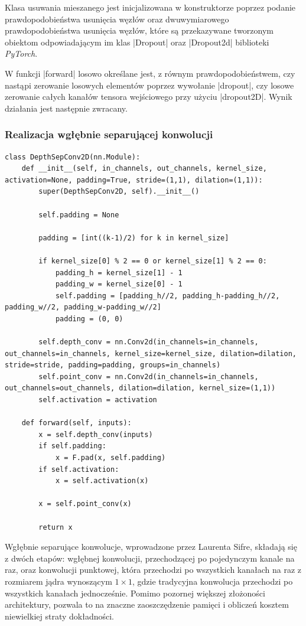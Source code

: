 Klasa usuwania mieszanego jest inicjalizowana w konstruktorze poprzez podanie prawdopodobieństwa usunięcia węzłów oraz dwuwymiarowego prawdopodobieństwa usunięcia węzłów, które są przekazywane tworzonym obiektom odpowiadającym im klas \pyth|Dropout| oraz \pyth|Dropout2d| biblioteki \textit{PyTorch}.

W funkcji \pyth|forward| losowo określane jest, z równym prawdopodobieństwem, czy nastąpi zerowanie losowych elementów poprzez wywołanie \pyth|dropout|, czy losowe zerowanie całych kanałów tensora wejściowego przy użyciu \pyth|dropout2D|. Wynik działania jest następnie zwracany. 


\subsubsection{Realizacja wgłębnie separującej konwolucji}

\begin{lstlisting}[caption={\pyth|DepSepConv2D| - klasa wgłębnie separującej konwolucji dwuwymiarowej.}, label={DepSepConv}]
class DepthSepConv2D(nn.Module):
	def __init__(self, in_channels, out_channels, kernel_size, activation=None, padding=True, stride=(1,1), dilation=(1,1)):
		super(DepthSepConv2D, self).__init__()
	
		self.padding = None
		
		padding = [int((k-1)/2) for k in kernel_size]
		
		if kernel_size[0] % 2 == 0 or kernel_size[1] % 2 == 0:
			padding_h = kernel_size[1] - 1
			padding_w = kernel_size[0] - 1
			self.padding = [padding_h//2, padding_h-padding_h//2, padding_w//2, padding_w-padding_w//2]
			padding = (0, 0)
		
		self.depth_conv = nn.Conv2d(in_channels=in_channels, out_channels=in_channels, kernel_size=kernel_size, dilation=dilation, stride=stride, padding=padding, groups=in_channels)
		self.point_conv = nn.Conv2d(in_channels=in_channels, out_channels=out_channels, dilation=dilation, kernel_size=(1,1))
		self.activation = activation
	
	def forward(self, inputs):
		x = self.depth_conv(inputs)
		if self.padding:
			x = F.pad(x, self.padding)
		if self.activation:
			x = self.activation(x)
		
		x = self.point_conv(x)
		
		return x
\end{lstlisting}


Wgłębnie separujące konwolucje, wprowadzone przez Laurenta Sifre\cite{Sifre2014}, składają się z dwóch etapów: wgłębnej konwolucji, przechodzącej po pojedynczym kanale na raz, oraz konwolucji punktowej, która przechodzi po wszystkich kanałach na raz z rozmiarem jądra wynoszącym $1 \times 1$, gdzie tradycyjna konwolucja przechodzi po wszystkich kanałach jednocześnie. Pomimo pozornej większej złożoności architektury, pozwala to na znaczne zaoszczędzenie pamięci i obliczeń kosztem niewielkiej straty dokładności.

